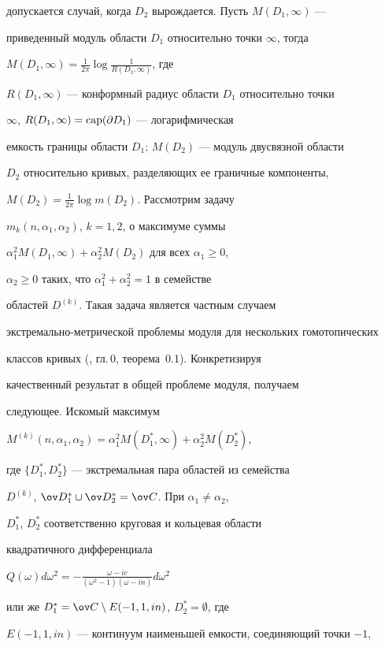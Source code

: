 допускается случай, когда $D_2$ вырождается. Пусть $M(D_1,\infty)$ --- 


приведенный модуль области $D_1$ относительно точки $\infty$, тогда 


$M(D_1,\infty)=\frac{1}{2\pi}\log\frac{1}{R(D_1,\infty)}$, где 


$R(D_1,\infty)$ --- конформный радиус области $D_1$ относительно точки 


$\infty$, $R(D_1,\infty)=\operatorname{cap}(\partial D_1)$ --- логарифмическая 


емкость границы области $D_1$; $M(D_2)$ --- модуль двусвязной области 


$D_2$ относительно кривых, разделяющих ее граничные компоненты, 


$M(D_2)=\frac{1}{2\pi}\log m(D_2)$. Рассмотрим задачу 


$m_k(n,\alpha_1,\alpha_2)$, $k=1,2$, о максимуме суммы 


$\alpha^2_1M(D_1,\infty)+\alpha^2_2M(D_2)$ для всех $\alpha_1\ge0$, 


$\alpha_2\ge0$ таких, что $\alpha^2_1+\alpha^2_2=1$ в семействе 


областей $D^{(k)}$. Такая задача является частным случаем 


экстремально-метрической проблемы модуля для нескольких гомотопических 


классов кривых (\cite{2}, гл.\,0, теорема~0.1). Конкретизируя 


качественный результат \cite{6} в общей проблеме модуля, получаем 


следующее. Искомый максимум 


$M^{(k)}(n,\alpha_1,\alpha_2)=\alpha^2_1M(D^*_1,\infty)+ 


\alpha^2_2M(D^*_2)$,


где $\{D^*_1,D^*_2\}$ --- экстремальная пара областей из семейства 


$D^{(k)}$, $\ov D^*_1\cup\ov D^*_2=\ov C$. При $\alpha_1\ne\alpha_2$, 


$D^*_1$, $D^*_2$ соответственно круговая и кольцевая области 


квадратичного дифференциала 


$Q(\omega)d\omega^2= 


-\frac{\omega-ic}{(\omega^2-1)(\omega-in)}d\omega^2$ 


или же $D^*_1=\ov C\setminus E(-1,1,in)$, $D^*_2=\emptyset$, где 


$E(-1,1,in)$ --- континуум наименьшей емкости, соединяющий точки $-1$, 



